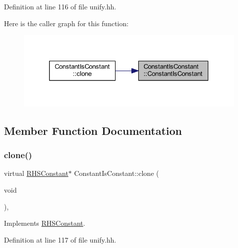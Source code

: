 Definition at line 116 of file unify.\+hh.

Here is the caller graph for this function\+:
\nopagebreak
\begin{figure}[H]
\begin{center}
\leavevmode
\includegraphics[width=326pt]{class_constant_is_constant_a1c9f0597dadddda355d25861841a166b_icgraph}
\end{center}
\end{figure}


\subsection{Member Function Documentation}
\mbox{\label{class_constant_is_constant_ac66be1ba7e938346231c0e206f5f8a65}} 
\subsubsection{\texorpdfstring{clone()}{clone()}}
{\footnotesize\ttfamily virtual \mbox{\hyperlink{class_r_h_s_constant}{R\+H\+S\+Constant}}$\ast$ Constant\+Is\+Constant\+::clone (\begin{DoxyParamCaption}\item[{void}]{ }\end{DoxyParamCaption})\hspace{0.3cm}{\ttfamily [inline]}, {\ttfamily [virtual]}}



Implements \mbox{\hyperlink{class_r_h_s_constant_a3e43335a89351a453932a8c0544d5722}{R\+H\+S\+Constant}}.



Definition at line 117 of file unify.\+hh.

